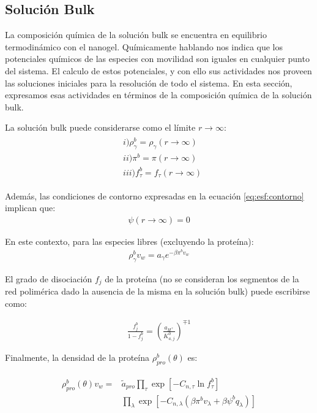 \subsection{Soluci\'on Bulk}\label{sec:esf:bulk}

La composici\'on qu\'imica de la soluci\'on bulk se encuentra en equilibrio termodin\'amico con el nanogel. Qu\'imicamente hablando nos indica que los potenciales qu\'imicos de las especies con movilidad son iguales en cualquier punto del sistema. 
El calculo de estos potenciales, y con ello sus actividades nos proveen  las soluciones iniciales para la resoluci\'on de todo el sistema.
En esta secci\'on, expresamos esas actividades en t\'erminos de la composici\'on qu\'imica de la soluci\'on bulk.

La soluci\'on bulk  puede considerarse como el límite $r \rightarrow \infty$:
\begin{align}
	\begin{aligned}
		& i)\rho^b_\gamma =\rho_\gamma (r \rightarrow \infty) \\
		& ii) \pi^b = \pi(r \rightarrow \infty) \\
		& iii) f_\tau^b = f_\tau(r \rightarrow \infty)
	\end{aligned}
\end{align}

Adem\'as, las condiciones de contorno expresadas en la ecuaci\'on \ref{eq:esf:contorno} implican que:
\begin{align}
	\psi(r \rightarrow \infty) = 0
\end{align}

En este contexto, para las especies libres (excluyendo la prote\'ina):
\begin{align}
	\rho_\gamma^b v_w = a_\gamma e^{-\beta\pi^bv_w}
	\label{eq:esf:free-bulk}
\end{align}

El grado de disociaci\'on $f_j$ de la prote\'ina (no se consideran los segmentos de la red polim\'erica dado la ausencia de la misma en la soluci\'on bulk) puede escribirse como:

\begin{align}
	\frac{f_j^b}{1-f_j^b} = \left(\frac{a_{H^+}}{K^0_{a,j}}\right)^{\mp 1}
\end{align}

Finalmente, la densidad de la prote\'ina $\rho_{pro}^b(\theta)$ es:

\begin{align}
	\begin{aligned}
		\rho^b_{pro}(\theta)v_w = &\tilde{a}_{pro} \prod_\tau\exp\left[-C_{n,\tau} \ln f^b_\tau\right] \\
		&\prod_\lambda \exp \left[-C_{n,\lambda} (\beta\pi^b v_\lambda + \beta\psi^b q_\lambda ) \right]
	\end{aligned}
	\label{eq:esf:bulk-protein}
\end{align}

